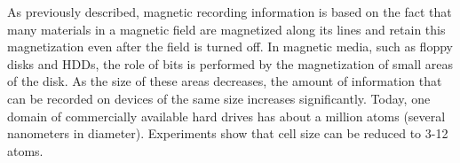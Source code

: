 \documentclass[a4paper,14pt]{extreport}
\begin{document}

   As previously described, magnetic recording information is based on the fact that many materials in a magnetic field are magnetized along its lines and retain this magnetization even after the field is turned off. In magnetic media, such as floppy disks and HDDs, the role of bits is performed by the magnetization of small areas of the disk. As the size of these areas decreases, the amount of information that can be recorded on devices of the same size increases significantly. Today, one domain of commercially available hard drives has about a million atoms (several nanometers in diameter). Experiments show that cell size can be reduced to 3-12 atoms. \par
\end{document}
